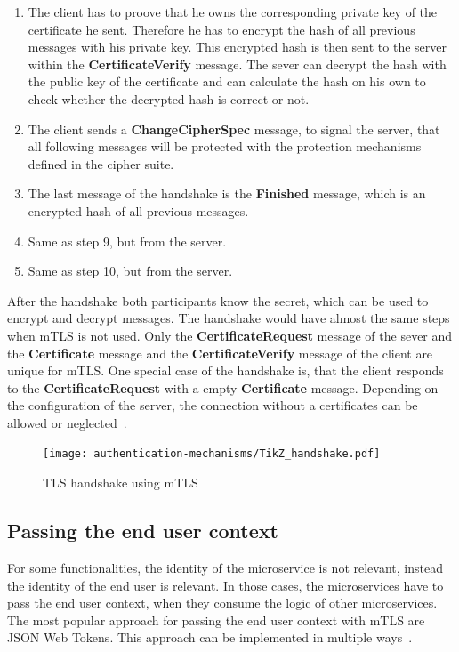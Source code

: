 \begin{enumerate}
	\item The client has to proove that he owns the corresponding private key of the certificate he sent.
		Therefore he has to encrypt the hash of all previous messages with his private key.
		This encrypted hash is then sent to the server within the \textbf{CertificateVerify} message.
		The sever can decrypt the hash with the public key of the certificate and can calculate the hash on his own to check whether the decrypted hash is correct or not.
	\item The client sends a \textbf{ChangeCipherSpec} message, to signal the server, that all following messages will be protected with the protection mechanisms defined in the cipher suite.
	\item The last message of the handshake is the \textbf{Finished} message, which is an encrypted hash of all previous messages.
	\item Same as step 9, but from the server.
	\item Same as step 10, but from the server.
\end{enumerate}
After the handshake both participants know the secret, which can be used to encrypt and decrypt messages.
The handshake would have almost the same steps when mTLS is not used.
Only the \textbf{CertificateRequest} message of the sever and the \textbf{Certificate} message and the \textbf{CertificateVerify} message of the client are unique for mTLS.
One special case of the handshake is, that the client responds to the \textbf{CertificateRequest} with a empty \textbf{Certificate} message.
Depending on the configuration of the server, the connection without a certificates can be allowed or neglected~\cite{parsovs2013practical}.

\begin{figure}
    \centering
	\texttt{[image: authentication-mechanisms/TikZ\_handshake.pdf]}
    \caption{TLS handshake using mTLS~\cite{parsovs2013practical}}
	\label{fig:tlshandshake}
\end{figure}

\subsection{Passing the end user context}
For some functionalities, the identity of the microservice is not relevant, instead the identity of the end user is relevant.
In those cases, the microservices have to pass the end user context, when they consume the logic of other microservices.
The most popular approach for passing the end user context with mTLS are JSON Web Tokens.
This approach can be implemented in multiple ways~\cite{dias2020microservices}.

